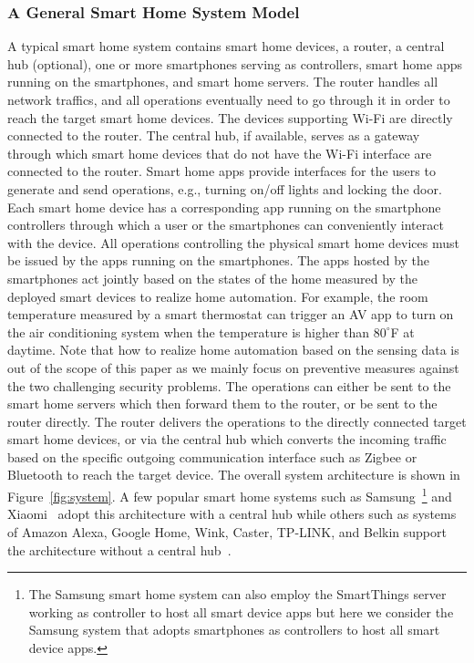 \documentclass[letterpaper,12pt]{article}
\begin{document}
\subsubsection{A General Smart Home System Model}
A typical smart home system contains smart home devices, a router, a central hub (optional), one or more smartphones serving as controllers, smart home apps running on the smartphones, and smart home servers.  %
The router handles all network traffics, and all operations eventually need to go through it in order to reach the target smart home devices. The devices supporting Wi-Fi are directly connected to the router. The central hub, if available, serves as a gateway through which smart home devices that do not have the Wi-Fi interface are connected to the router. Smart home apps provide interfaces for the users to generate and send operations, e.g., turning on/off lights and locking the door. Each smart home device has a corresponding app running on the smartphone controllers through which a user or the smartphones can conveniently interact with the device. All operations controlling the physical smart home devices must be issued by the apps running on the smartphones.  The apps hosted by the smartphones act jointly based on the states of the home measured by the deployed smart devices to realize home automation. For example, the room temperature measured by a smart thermostat can trigger an AV app to turn on the air conditioning system when the temperature is higher than $80^\circ$F at daytime. Note that how to realize home automation based on the sensing data is out of the scope of this paper as we mainly focus on preventive measures against the two challenging security problems. The operations can either be sent to the smart home servers which then forward them to the router, or be sent to the router directly. The router delivers the operations to the directly connected target smart home devices, or via the central hub which converts the incoming traffic based on the specific outgoing communication interface such as Zigbee or Bluetooth to reach the target device. The overall system architecture is shown in Figure~\ref{fig:system}. A few popular smart home systems such as Samsung~\cite{samsungsmarthome}\footnote{The Samsung smart home system can also employ the SmartThings server working as controller to host all smart device apps but here we consider the Samsung system that adopts smartphones as controllers to host all smart device apps.} and Xiaomi~\cite{xiaomismarthome} adopt this architecture with a central hub while others such as systems of Amazon Alexa, Google Home, Wink, Caster, TP-LINK, and Belkin support the architecture without a central hub~\cite{bestselling}.
\end{document}
